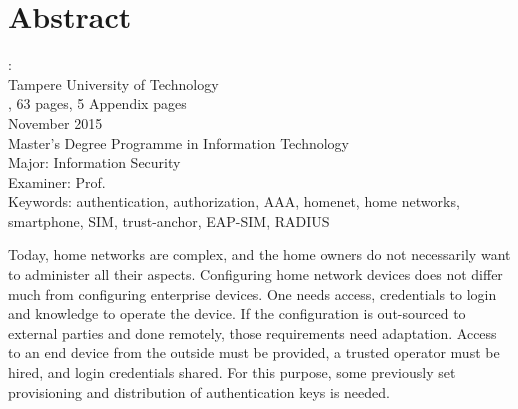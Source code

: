 \documentclass[12pt,a4paper,english]{tutthesis}
\begin{document}
\setcounter{page}{0} %

\chapter*{Abstract}

\begin{spacing}{1.0}
  {\bf \textsf{\MakeUppercase{\@author}}}: \@title\\   %
   \textsf{Tampere University of Technology}\\
   \textsf{\@thesistype, 63 pages, 5 Appendix pages} \\
   \textsf{November 2015}\\
   \textsf{Master's Degree Programme in Information Technology}\\
   \textsf{Major: Information Security}\\
   \textsf{Examiner: Prof. \@examiner}\\ %
   \textsf{Keywords: authentication, authorization, AAA, homenet, home networks, smartphone, SIM, trust-anchor, EAP-SIM, RADIUS}\\
\end{spacing}


Today, home networks are complex, and the home owners 
do not necessarily want to administer all their aspects.
Configuring home network devices does not differ much from configuring enterprise devices. One needs access, credentials to login and knowledge to operate the device. If the configuration is out-sourced to external parties and 
done remotely, those requirements need adaptation.
Access to an end device from the outside must be provided, a trusted operator must be hired, and login credentials shared.
For this purpose,  some previously set provisioning and distribution of authentication keys is needed.
\end{document}
